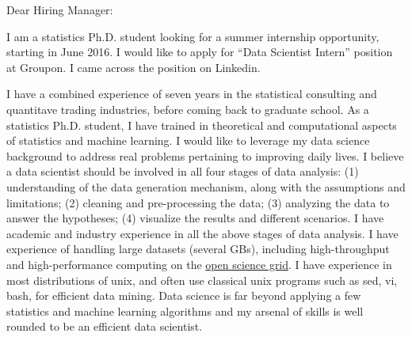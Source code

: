 \documentclass{letter} %
\begin{document}
\begin{letter}
\opening{Dear Hiring Manager:} 
 
\noindent %
I am a statistics Ph.D. student looking for a summer internship opportunity, starting in June 2016. I would like to apply for ``Data Scientist Intern'' position at Groupon. I came across the position on Linkedin.
 
\noindent %
I have a combined experience of seven years in the statistical consulting and quantitave trading industries, before coming back to graduate school. As a statistics Ph.D. student, I have trained in theoretical and computational aspects of statistics and machine learning. I would like to leverage my data science background to address real problems pertaining to improving daily lives. I believe a data scientist should be involved in all four stages of data analysis: (1) understanding of the data generation mechanism, along with the assumptions and limitations; (2) cleaning and pre-processing the data; (3) analyzing the data to answer the hypotheses; (4) visualize the results and different scenarios. I have academic and industry experience in all the above stages of data analysis. I have experience of handling large datasets (several GBs), including high-throughput and high-performance computing on the \href{http://www.opensciencegrid.org/}{open science grid}. I have experience in most distributions of unix, and often use classical unix programs such as sed, vi, bash, for efficient data mining. Data science is far beyond applying a few statistics and machine learning algorithms and my arsenal of skills is well rounded to be an efficient data scientist. 


\end{letter}
\end{document}
